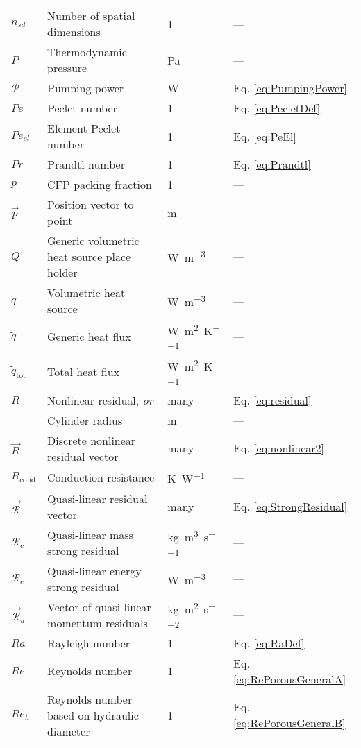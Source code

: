 \begin{longtable}{p{2cm}p{9cm}p{2cm}p{5cm}}
\(n_{sd}\) & Number of spatial dimensions & 1 & ---\\
\(P\) & Thermodynamic pressure & \si{\pascal} & ---\\
\(\mathcal{P}\) & Pumping power & \si{\watt} & Eq. \eqref{eq:PumpingPower}\\
\(Pe\) & Peclet number & 1 & Eq. \eqref{eq:PecletDef}\\
\(Pe_{el}\) & Element Peclet number & 1 & Eq. \eqref{eq:PeEl}\\
\(Pr\) & Prandtl number & 1 & Eq. \eqref{eq:Prandtl}\\
\(p\) & CFP packing fraction & 1 & ---\\
\(\vec{p}\) & Position vector to point & \si{\meter} & ---\\
\(Q\) & Generic volumetric heat source place holder & \si{\watt\per\cubic\meter} & ---\\
\(\dot{q}\) & Volumetric heat source & \si{\watt\per\cubic\meter} & ---\\
\(\tilde{q}\) & Generic heat flux & \si{\watt\per\square\meter\per\kelvin} & ---\\
\(\tilde{q}_\text{tot}\) & Total heat flux & \si{\watt\per\square\meter\per\kelvin} & ---\\
\(R\) & Nonlinear residual, \textit{or} & many & Eq. \eqref{eq:residual}\\
& Cylinder radius & \si{\meter} & ---\\
\(\vec{R}\) & Discrete nonlinear residual vector & many & Eq. \eqref{eq:nonlinear2}\\
\(R_{\text{cond}}\) & Conduction resistance & \si{\kelvin\per\watt} & ---\\
\(\vec{\mathscr{R}}\) & Quasi-linear residual vector & many & Eq. \eqref{eq:StrongResidual}\\
\(\mathscr{R}_c\) & Quasi-linear mass strong residual & \si{\kilo\gram\per\cubic\meter\per\second} & ---\\
\(\mathscr{R}_e\) & Quasi-linear energy strong residual & \si{\watt\per\cubic\meter} & ---\\
\(\vec{\mathscr{R}}_u\) & Vector of quasi-linear momentum residuals & \si{\kilo\gram\per\square\meter\per\square\second} & ---\\
\(Ra\) & Rayleigh number & 1 & Eq. \eqref{eq:RaDef}\\
\(Re\) & Reynolds number & 1 & Eq. \eqref{eq:RePorousGeneralA}\\
\(Re_h\) & Reynolds number based on hydraulic diameter & 1 & Eq. \eqref{eq:RePorousGeneralB}\\

\end{longtable}

